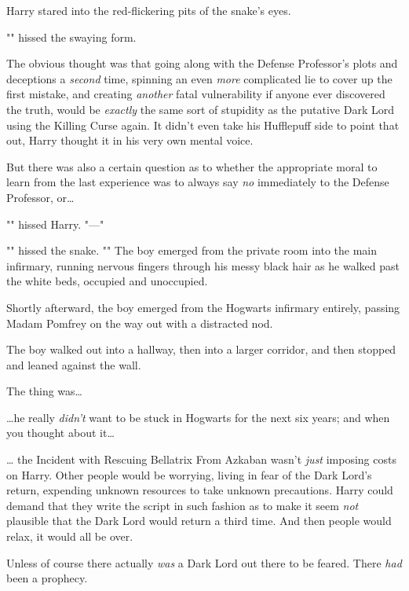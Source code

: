 Harry stared into the red-flickering pits of the snake's eyes.

"" hissed the swaying form.

The obvious thought was that going along with the Defense Professor's plots and
deceptions a \emph{second} time, spinning an even \emph{more} complicated lie
to cover up the first mistake, and creating \emph{another} fatal vulnerability
if anyone ever discovered the truth, would be \emph{exactly} the same sort of
stupidity as the putative Dark Lord using the Killing Curse again. It didn't
even take his Hufflepuff side to point that out, Harry thought it in his very
own mental voice.

But there was also a certain question as to whether the appropriate moral to
learn from the last experience was to always say \emph{no} immediately to the
Defense Professor, or{\ldots}

"" hissed Harry. "---"

"" hissed the snake. ""
\later
The boy emerged from the private room into the main infirmary, running nervous
fingers through his messy black hair as he walked past the white beds, occupied
and unoccupied.

Shortly afterward, the boy emerged from the Hogwarts infirmary entirely,
passing Madam Pomfrey on the way out with a distracted nod.

The boy walked out into a hallway, then into a larger corridor, and then
stopped and leaned against the wall.

The thing was{\ldots}

{\ldots}he really \emph{didn't} want to be stuck in Hogwarts for the next six
years; and when you thought about it{\ldots}

{\ldots} the Incident with Rescuing Bellatrix From Azkaban wasn't \emph{just}
imposing costs on Harry. Other people would be worrying, living in fear of the
Dark Lord's return, expending unknown resources to take unknown precautions.
Harry could demand that they write the script in such fashion as to make it
seem \emph{not} plausible that the Dark Lord would return a third time. And
then people would relax, it would all be over.

Unless of course there actually \emph{was} a Dark Lord out there to be feared.
There \emph{had} been a prophecy.

